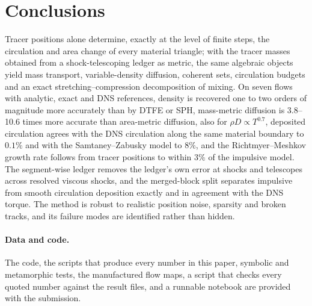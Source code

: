 \documentclass[11pt]{article}
\theoremstyle{definition}\newtheorem{definition}{Definition}\theoremstyle{remark}\newtheorem{remark}{Remark}
\begin{document}
\section{Conclusions}
Tracer positions alone determine, exactly at the level of finite steps, the circulation and area change of every material triangle; with the tracer masses obtained from a shock-telescoping ledger as metric, the same algebraic objects yield mass transport, variable-density diffusion, coherent sets, circulation budgets and an exact stretching--compression decomposition of mixing. On seven flows with analytic, exact and DNS references, density is recovered one to two orders of magnitude more accurately than by DTFE or SPH, mass-metric diffusion is 3.8--10.6 times more accurate than area-metric diffusion, also for $\rho D\propto T^{0.7}$, deposited circulation agrees with the DNS circulation along the same material boundary to $0.1\%$ and with the Samtaney--Zabusky model to $8\%$, and the Richtmyer--Meshkov growth rate follows from tracer positions to within $3\%$ of the impulsive model. The segment-wise ledger removes the ledger's own error at shocks and telescopes across resolved viscous shocks, and the merged-block split separates impulsive from smooth circulation deposition exactly and in agreement with the DNS torque. The method is robust to realistic position noise, sparsity and broken tracks, and its failure modes are identified rather than hidden.

\paragraph{Data and code.} The code, the scripts that produce every number in this paper, symbolic and metamorphic tests, the manufactured flow maps, a script that checks every quoted number against the result files, and a runnable notebook are provided with the submission.
\end{document}
